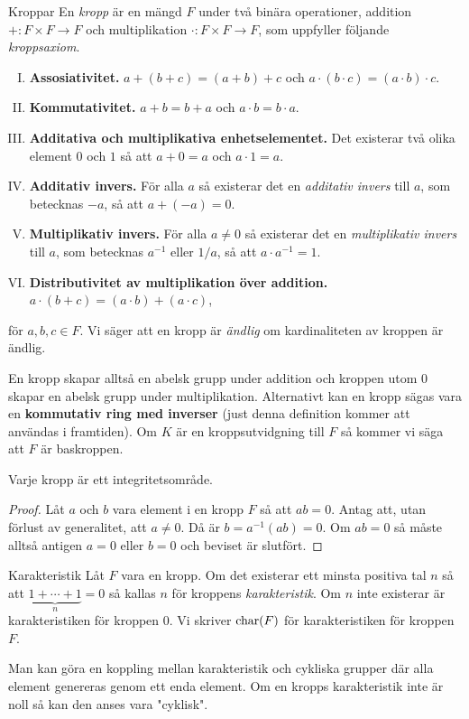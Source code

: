 \documentclass{article}
\newcommand{\kar}[0]{\textnormal{char}}
\theoremstyle{definition}
\begin{document}
\begin{mydef}{Kroppar}{}
    En \textit{kropp} är en mängd $F$ under två binära operationer, addition $+:F \times F \rightarrow F$ 
    och multiplikation $\cdot: F \times F \rightarrow F$, som uppfyller följande \textit{kroppsaxiom}.
    \begin{enumerate}[I)]
        \item \textbf{Assosiativitet.} $a + (b + c) = (a + b) + c$ och $a \cdot (b \cdot c) = (a \cdot b) \cdot c$.
        \item \textbf{Kommutativitet.} $a + b = b + a$ och $a \cdot b = b \cdot a$.
        \item \textbf{Additativa och multiplikativa enhetselementet.} Det existerar två olika element $0$ och $1$ så att $a + 0 = a$ och $a \cdot 1 = a.$
        \item \textbf{Additativ invers.} För alla $a$ så existerar det en \textit{additativ invers} till $a$, som betecknas
        $-a$, så att $a + (-a) = 0$.
        \item \textbf{Multiplikativ invers.} För alla $a \neq 0$ så existerar det en \textit{multiplikativ invers} till $a$, som betecknas $a^{-1}$ eller $1/a$, så att 
        $a \cdot a^{-1} = 1.$
        \item \textbf{Distributivitet av multiplikation över addition.} $a \cdot (b + c) = (a \cdot b) + (a \cdot c)$,
    \end{enumerate}
    för $a, b, c \in F.$ Vi säger att en kropp är \textit{ändlig} om kardinaliteten av kroppen är ändlig.
\end{mydef}
En kropp skapar alltså en abelsk grupp under addition och kroppen utom $0$ skapar en abelsk grupp under multiplikation. Alternativt kan en kropp sägas
vara en \textbf{kommutativ ring med inverser} (just denna definition kommer att användas i framtiden). 
Om $K$ är en kroppsutvidgning till $F$ så kommer vi säga att $F$ är baskroppen. 

\begin{myprop}{}{}
  Varje kropp är ett integritetsområde.
\end{myprop}

\begin{proof}
  Låt $a$ och $b$ vara element i en kropp $F$ så att $ab = 0$. Antag att, utan förlust av generalitet, att $a \neq 0.$ 
  Då är $b = a^{-1}(ab) = 0$. Om $ab = 0$ så måste alltså antigen $a = 0$ eller $b = 0$ och beviset är slutfört.
\end{proof}

\begin{mydef}{Karakteristik}{}
  Låt $F$ vara en kropp. Om det existerar ett minsta positiva tal $n$ så att $\underbrace{1 + \cdots + 1}_{n} = 0$ så kallas $n$ för kroppens \textit{karakteristik}.
  Om $n$ inte existerar är karakteristiken för kroppen $0.$ Vi skriver $\kar(F)$ för karakteristiken för kroppen $F$.
\end{mydef}
Man kan göra en koppling mellan karakteristik och cykliska grupper där alla element genereras genom ett enda element. Om en kropps karakteristik inte är noll
så kan den anses vara "cyklisk". 
\end{document}
